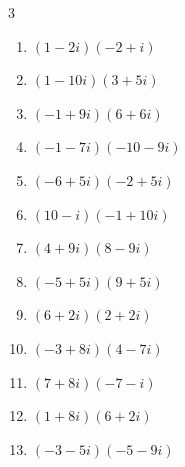 \begin{multicols}{3}
\begin{enumerate}
        \phantom{$\displaystyle =-22-34i$}

  \item $\displaystyle (1-2i)(-2+i)$

        \phantom{$\displaystyle =5i$}

  \item $\displaystyle (1-10i)(3+5i)$

        \phantom{$\displaystyle =53-25i$}

  \item $\displaystyle (-1+9i)(6+6i)$

        \phantom{$\displaystyle =-60+48i$}

  \item $\displaystyle (-1-7i)(-10-9i)$

        \phantom{$\displaystyle =-53+79i$}

  \item $\displaystyle (-6+5i)(-2+5i)$

        \phantom{$\displaystyle =-13-40i$}

  \item $\displaystyle (10-i)(-1+10i)$

        \phantom{$\displaystyle =101i$}

  \item $\displaystyle (4+9i)(8-9i)$

        \phantom{$\displaystyle =113+36i$}

  \item $\displaystyle (-5+5i)(9+5i)$

        \phantom{$\displaystyle =-70+20i$}

\columnbreak %

  \item $\displaystyle (6+2i)(2+2i)$

        \phantom{$\displaystyle =8+16i$}

  \item $\displaystyle (-3+8i)(4-7i)$

        \phantom{$\displaystyle =44+53i$}

  \item $\displaystyle (7+8i)(-7-i)$

        \phantom{$\displaystyle =-41-63i$}

  \item $\displaystyle (1+8i)(6+2i)$

        \phantom{$\displaystyle =-10+50i$}

  \item $\displaystyle (-3-5i)(-5-9i)$


\end{enumerate}
\end{multicols}
